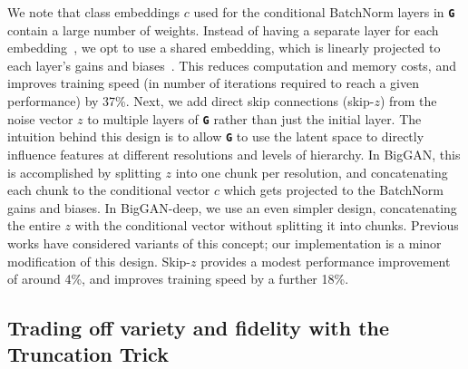 \documentclass{article} %
\newcommand{\gen}{\textbf{\texttt{G}}}
\begin{document}
We note that class embeddings $c$ used for the conditional BatchNorm layers in \gen{} contain a large number of weights. Instead of having a separate layer for each embedding~\citep{miyato2018spectral,zhang2018sagan}, we opt to use a shared embedding, which is linearly projected to each layer's gains and biases~\citep{perez2018film}. This reduces computation and memory costs, and  improves training speed (in number of iterations required to reach a given performance) by 37\%.
Next, we 
add direct skip connections (skip-$z$) from the noise vector $z$ to multiple layers of \gen{} rather than just the initial layer.
The intuition behind this design is to allow \gen{} to use the latent space to directly influence features at different resolutions and levels of hierarchy. 
In BigGAN, this is accomplished by splitting $z$ into one chunk per resolution, and concatenating each chunk to the conditional vector $c$ which gets projected to the BatchNorm gains and biases.
In BigGAN-deep, we use an even simpler design, concatenating the entire $z$ with the conditional vector without splitting it into chunks.
Previous works \citep{goodfellow2014gans, denton2015lapgan} have considered variants of this concept; our implementation is a minor modification of this design. 
Skip-$z$ provides a modest performance improvement of around 4\%, and improves training speed  by a further 18\%.  



\subsection{Trading off variety and fidelity with the Truncation Trick}
\label{subsec_truncation}
\end{document}
